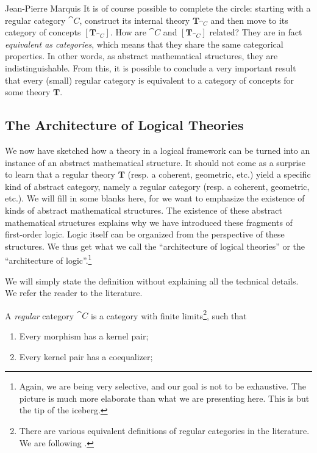 \begin{artengenv}{Jean-Pierre Marquis}
It is of course possible to complete the circle: starting with a regular category \( \cat{C} \), construct its internal theory \( \mathbf{T}_{\cat{C}} \) and then move to its category of concepts \( [\mathbf{T}_{\cat{C}}] \). How are \( \cat{C} \) and \( [\mathbf{T}_{\cat{C}}] \) related? They are in fact \textit{equivalent as categories}, which means that they share the same categorical properties. In other words, as abstract mathematical structures, they are indistinguishable. From this, it is possible to conclude a very important result that every (small) regular category is equivalent to a category of concepts for some theory \( \mathbf{T} \). 

\subsection{The Architecture of Logical Theories}

We now have sketched how a theory in a logical framework can be turned into an instance of an abstract mathematical structure. It should not come as a surprise to learn that a regular theory \( \mathbf{T} \) (resp. a coherent, geometric, etc.) yield a specific kind of abstract category, namely a regular category (resp. a coherent, geometric, etc.). We will fill in some blanks here, for we want to emphasize the existence of kinds of abstract mathematical structures. The existence of these abstract mathematical structures explains why we have introduced these fragments of first-order logic. Logic itself can be organized from the perspective of these structures. We thus get what we call the ``architecture of logical theories'' or the ``architecture of logic''.\footnote{Again, we are being very selective, and our goal is not to be exhaustive. The picture is much more elaborate than what we are presenting here. This is but the tip of the iceberg.}

We will simply state the definition without explaining all the technical details. We refer the reader to the literature. 

A \textit{regular} category \( \cat{C} \) is a category with finite limits\footnote{There are various equivalent definitions of regular categories in the literature. We are following \parencite{Borceux1994}.}, such that 
\begin{enumerate}
	\item Every morphism has a kernel pair;
	
	\item Every kernel pair has a coequalizer;
	

\end{enumerate}
\end{artengenv}

